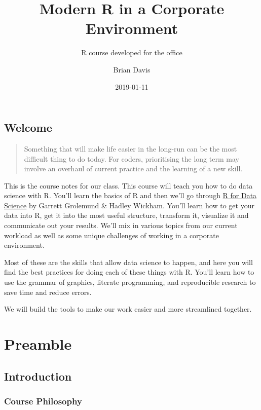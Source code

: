 \documentclass[]{book}
\title{Modern R in a Corporate Environment}
\subtitle{R course developed for the office}
\author{Brian Davis}
\date{2019-01-11}
\begin{document}
\maketitle

{
\setcounter{tocdepth}{1}
\tableofcontents
}
\chapter*{Welcome}\label{welcome}

\begin{quote}
Something that will make life easier in the long-run can be the most
difficult thing to do today. For coders, prioritising the long term may
involve an overhaul of current practice and the learning of a new skill.
\end{quote}

This is the course notes for our class. This course will teach you how
to do data science with R. You'll learn the basics of R and then we'll
go through \href{http://r4ds.had.co.nz/index.html}{R for Data Science}
by Garrett Grolemund \& Hadley Wickham. You'll learn how to get your
data into R, get it into the most useful structure, transform it,
visualize it and communicate out your results. We'll mix in various
topics from our current workload as well as some unique challenges of
working in a corporate environment.

Most of these are the skills that allow data science to happen, and here
you will find the best practices for doing each of these things with R.
You'll learn how to use the grammar of graphics, literate programming,
and reproducible research to save time and reduce errors.

We will build the tools to make our work easier and more streamlined
together.

\part{Preamble}\label{part-preamble}

\chapter{Introduction}\label{preamble-intro}

\section{Course Philosophy}\label{course-philosophy}
\end{document}
